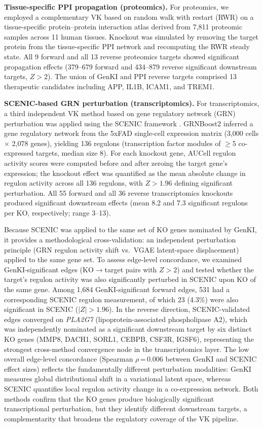 \documentclass[12pt,a4paper]{article}
\begin{document}
\textbf{Tissue-specific PPI propagation (proteomics).}
For proteomics, we employed a complementary VK based on random walk with restart (RWR) on a tissue-specific protein--protein interaction atlas \citep{lamantrip2025} derived from 7{,}811 proteomic samples across 11 human tissues. Knockout was simulated by removing the target protein from the tissue-specific PPI network and recomputing the RWR steady state. All 9 forward and all 13 reverse proteomics targets showed significant propagation effects (379--679 forward and 434--879 reverse significant downstream targets, $Z > 2$). The union of GenKI and PPI reverse targets comprised 13 therapeutic candidates including APP, IL1B, ICAM1, and TREM1.

\textbf{SCENIC-based GRN perturbation (transcriptomics).}
For transcriptomics, a third independent VK method based on gene regulatory network (GRN) perturbation was applied using the SCENIC framework \citep{aibar2017, moerman2019}. GRNBoost2 \citep{moerman2019} inferred a gene regulatory network from the 5xFAD single-cell expression matrix (3{,}000 cells $\times$ 2{,}078 genes), yielding 136 regulons (transcription factor modules of $\geq$5 co-expressed targets, median size 8). For each knockout gene, AUCell \citep{aibar2017} regulon activity scores were computed before and after zeroing the target gene's expression; the knockout effect was quantified as the mean absolute change in regulon activity across all 136 regulons, with $Z > 1.96$ defining significant perturbation. All 55 forward and all 36 reverse transcriptomics knockouts produced significant downstream effects (mean 8.2 and 7.3 significant regulons per KO, respectively; range 3--13).

Because SCENIC was applied to the same set of KO genes nominated by GenKI, it provides a methodological cross-validation: an independent perturbation principle (GRN regulon activity shift vs.\ VGAE latent-space displacement) applied to the same gene set. To assess edge-level concordance, we examined GenKI-significant edges (KO$\rightarrow$target pairs with $Z > 2$) and tested whether the target's regulon activity was also significantly perturbed in SCENIC upon KO of the same gene. Among 1{,}684 GenKI-significant forward edges, 531 had a corresponding SCENIC regulon measurement, of which 23 (4.3\%) were also significant in SCENIC ($|Z| > 1.96$). In the reverse direction, SCENIC-validated edges converged on \textit{PLA2G7} (lipoprotein-associated phospholipase A2), which was independently nominated as a significant downstream target by six distinct KO genes (MMP8, DACH1, SORL1, CEBPB, CSF3R, IGSF6), representing the strongest cross-method convergence node in the transcriptomics layer. The low overall edge-level concordance (Spearman $\rho$\,=\,0.006 between GenKI and SCENIC effect sizes) reflects the fundamentally different perturbation modalities: GenKI measures global distributional shift in a variational latent space, whereas SCENIC quantifies local regulon activity change in a co-expression network. Both methods confirm that the KO genes produce biologically significant transcriptional perturbation, but they identify different downstream targets, a complementarity that broadens the regulatory coverage of the VK pipeline.
\end{document}
